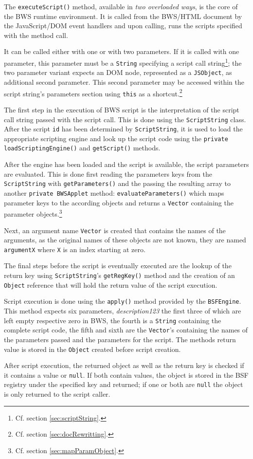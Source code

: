 The \texttt{executeScript()} method, available in \emph{two overloaded ways}, is the core of the BWS runtime environment. It is called from the BWS/HT\-ML document by the JavaScript/DOM event handlers and upon calling, runs the scripts specified with the method call.

It can be called either with one or with two parameters. If it is called with one parameter, this parameter must be a \texttt{String} specifying a script call string\footnote{Cf. section \ref{sec:scriptString}.}; the two parameter variant expects an DOM node, represented as a \texttt{JSObject}, as additional second parameter. This second parameter may be accessed within the script string's parameters section using \texttt{this} as a shortcut.\footnote{Cf. section \ref{sec:docRewritting}.}


The first step in the execution of BWS script is the interpretation of the script call string passed with the script call. This is done using the \texttt{ScriptString} class. After the script \texttt{id} has been determined by \texttt{ScriptString}, it is used to load the appropriate scripting engine and look up the script code using the \texttt{private loadScriptingEngine()} and \texttt{getScript()} methods.

After the engine has been loaded and the script is available, the script parameters are evaluated. This is done first reading the parameters keys from the \texttt{ScriptString} with \texttt{getParameters()} and the passing the resulting array to another \texttt{private BWSApplet} method: \texttt{evaluateParameters()} which maps parameter keys to the according objects and returns a \texttt{Vector} containing the parameter objects.\footnote{Cf. section \ref{sec:mapParamObject}.}

Next, an argument name \texttt{Vector} is created that contains the names of the arguments, as the original names of these objects are not known, they are named \texttt{argumentX} where \texttt{X} is an index starting at zero.

The final steps before the script is eventually executed are the lookup of the return key using \texttt{ScriptString}'s \texttt{getRegKey()} method and the creation of an \texttt{Object} reference that will hold the return value of the script execution.

Script execution is done using the \texttt{apply()} method provided by the \texttt{BSFEngine}. This method expects six parameters, \emph{description123} the first three of which are left empty respective zero in BWS, the fourth is a \texttt{String} containing the complete script code, the fifth and sixth are the \texttt{Vector}'s containing the names of the parameters passed and the parameters for the script. The methods return value is stored in the \texttt{Object} created before script creation.

After script execution, the returned object as well as the return key is checked if it contains a value or \texttt{null}. If both contain values, the object is stored in the BSF registry under the specified key and returned; if one or both are \texttt{null} the object is only returned to the script caller.

